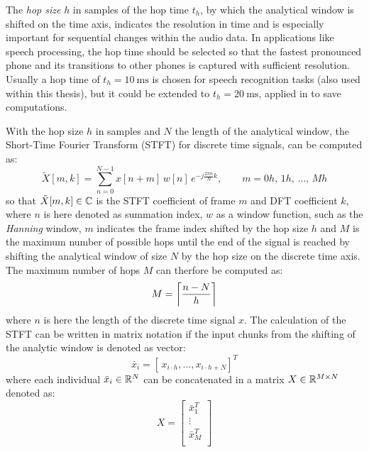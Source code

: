 The \emph{hop size} $h$ in samples of the hop time $t_h$, by which the analytical window is shifted on the time axis, indicates the resolution in time and is especially important for sequential changes within the audio data.
In applications like speech processing, the hop time should be selected so that the fastest pronounced phone and its transitions to other phones is captured with sufficient resolution.
Usually a hop time of $t_{h}=\SI{10}{\milli\second}$ is chosen for speech recognition tasks (also used within this thesis), but it could be extended to $t_{h}=\SI{20}{\milli\second}$, applied in \cite{Peter2020} to save computations.

With the hop size $h$ in samples and $N$ the length of the analytical window, the Short-Time Fourier Transform (STFT) for discrete time signals, can be computed as:
\begin{equation}\label{eq:signal_spec_stft}
    \tilde{X}[m, k] = \sum_{n=0}^{N-1} x[n + m] \, w[n] \, e^{-j\frac{2 \pi n}{N}k}, \qquad m = 0 h, \, 1 h, \, \dots, \, M h 
\end{equation}
so that $\tilde{X}[m, k] \in \C$ is the STFT coefficient of frame $m$ and DFT coefficient $k$, where $n$ is here denoted as summation index, $w$ as a window function, such as the \emph{Hanning} window, $m$ indicates the frame index shifted by the hop size $h$ and $M$ is the maximum number of possible hops until the end of the signal is reached by shifting the analytical window of size $N$ by the hop size on the discrete time axis.
The maximum number of hops $M$ can therfore be computed as:
\begin{equation}\label{eq:signal_spec_hop}
  M = \ceil*{\frac{n-N}{h}}
\end{equation}
where $n$ is here the length of the discrete time signal $x$.
The calculation of the STFT can be written in matrix notation if the input chunks from the shifting of the analytic window is denoted as vector:
\begin{equation}
  \bar{x}_i = [\, x_{i \cdot h}, \dots, x_{i \cdot h+N}]^T
\end{equation}
where each individual $\bar{x}_i \in \R^N$ can be concatenated in a matrix $X \in \R^{M \times N}$ denoted as:
\begin{equation}
  X = 
  \begin{bmatrix}
    \bar{x}_1^T \\
    \vdots\\
    \bar{x}_M^T \\
  \end{bmatrix}
\end{equation}
